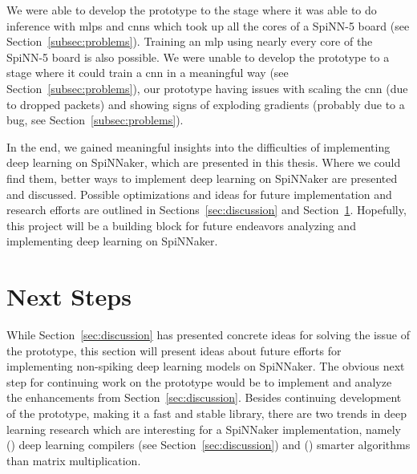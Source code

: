 \documentclass[]{article}
\begin{document}
We were able to develop the prototype to the stage where it was able
to do inference with \acrshort{mlp}s and \acrshort{cnn}s which took up all the cores of a
SpiNN-5 board (see Section~\ref{subsec:problems}).
Training an \acrshort{mlp} using nearly every core of the SpiNN-5 board is also
possible.
We were unable to develop the prototype to a stage where it could
train a \acrshort{cnn} in a meaningful way (see Section~\ref{subsec:problems}),
our prototype having issues with scaling the \acrshort{cnn} (due to dropped
packets) and showing signs of exploding gradients (probably due to
a bug, see Section~\ref{subsec:problems}).

In the end, we gained meaningful insights into the difficulties of
implementing deep learning on SpiNNaker, which are presented in this
thesis.
Where we could find them, better ways to implement deep learning on
SpiNNaker are presented and discussed.
Possible optimizations and ideas for future implementation and
research efforts are outlined in Sections~\ref{sec:discussion} and
Section~\ref{sec:next_steps}.
Hopefully, this project will be a building block for future endeavors
analyzing and implementing deep learning on SpiNNaker.




\section{Next Steps} %
\label{sec:next_steps}

While Section~\ref{sec:discussion} has presented concrete ideas for
solving the issue of the prototype, this section will present ideas
about future efforts for implementing non-spiking deep learning models
on SpiNNaker.
The obvious next step for continuing work on the prototype would be
to implement and analyze the enhancements from
Section~\ref{sec:discussion}.
Besides continuing development of the prototype, making it a fast
and stable library, there are two trends in deep learning research
which are interesting for a SpiNNaker implementation, namely
() deep learning compilers
(see Section~\ref{sec:discussion}) and ()
smarter algorithms than matrix multiplication.
\end{document}

